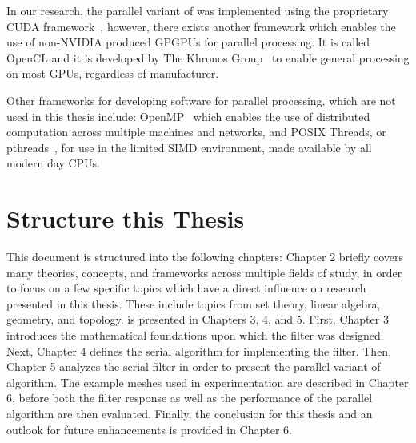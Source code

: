In our research, the parallel variant of  was implemented using the proprietary CUDA framework~\cite{CUDA18}, however, there exists another framework which enables the use of non-NVIDIA produced \glspl{GPGPU} for parallel processing. It is called OpenCL and it is developed by The Khronos Group~\cite{Khronos19} to enable general processing on most \glspl{GPU}, regardless of manufacturer.

Other frameworks for developing software for parallel processing, which are not used in this thesis include: OpenMP~\cite{OpenMP19} which enables the use of distributed computation across multiple machines and networks, and POSIX Threads, or pthreads~\cite[p.~195-210]{Lang17}, for use in the limited \gls{SIMD} environment, made available by all modern day \glspl{CPU}.

%
%
%
%
%
%
\section{Structure this Thesis}
This document is structured into the following chapters: Chapter 2 briefly covers many theories, concepts, and frameworks across multiple fields of study, in order to focus on a few specific topics which have a direct influence on research presented in this thesis. These include topics from set theory, linear algebra, geometry, and topology.  is presented in Chapters 3, 4, and 5. First, Chapter 3 introduces the mathematical foundations upon which the filter was designed. Next, Chapter 4 defines the serial algorithm for implementing the filter. Then, Chapter 5 analyzes the serial filter in order to present the parallel variant of  algorithm. The example meshes used in experimentation are described in Chapter 6, before both the filter response as well as the performance of the parallel algorithm are then evaluated. Finally, the conclusion for this thesis and an outlook for future enhancements is provided in Chapter 6.
